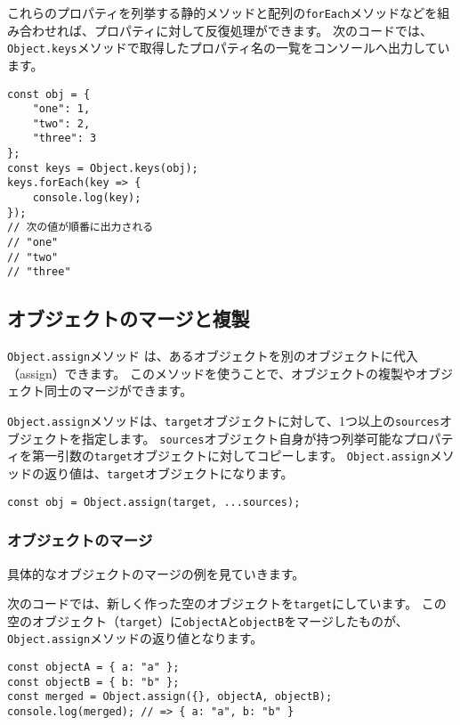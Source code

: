 これらのプロパティを列挙する静的メソッドと配列の\texttt{forEach}メソッドなどを組み合わせれば、プロパティに対して反復処理ができます。
次のコードでは、\texttt{Object.keys}メソッドで取得したプロパティ名の一覧をコンソールへ出力しています。

\begin{lstlisting}
const obj = {
    "one": 1,
    "two": 2,
    "three": 3
};
const keys = Object.keys(obj);
keys.forEach(key => {
    console.log(key);
});
// 次の値が順番に出力される
// "one"
// "two"
// "three"
\end{lstlisting}

\hypertarget{copy-and-merge}{%
\subsection{オブジェクトのマージと複製}\label{copy-and-merge}}

\texttt{Object.assign}メソッド\,\protect{}\,は、あるオブジェクトを別のオブジェクトに代入（assign）できます。
このメソッドを使うことで、オブジェクトの複製やオブジェクト同士のマージができます。

\texttt{Object.assign}メソッドは、\texttt{target}オブジェクトに対して、1つ以上の\texttt{sources}オブジェクトを指定します。
\texttt{sources}オブジェクト自身が持つ列挙可能なプロパティを第一引数の\texttt{target}オブジェクトに対してコピーします。
\texttt{Object.assign}メソッドの返り値は、\texttt{target}オブジェクトになります。

\begin{lstlisting}
const obj = Object.assign(target, ...sources);
\end{lstlisting}

\hypertarget{merge}{%
\subsubsection{オブジェクトのマージ}\label{merge}}

具体的なオブジェクトのマージの例を見ていきます。

次のコードでは、新しく作った空のオブジェクトを\texttt{target}にしています。
この空のオブジェクト（\texttt{target}）に\texttt{objectA}と\texttt{objectB}をマージしたものが、\texttt{Object.assign}メソッドの返り値となります。

\begin{lstlisting}
const objectA = { a: "a" };
const objectB = { b: "b" };
const merged = Object.assign({}, objectA, objectB);
console.log(merged); // => { a: "a", b: "b" }
\end{lstlisting}

